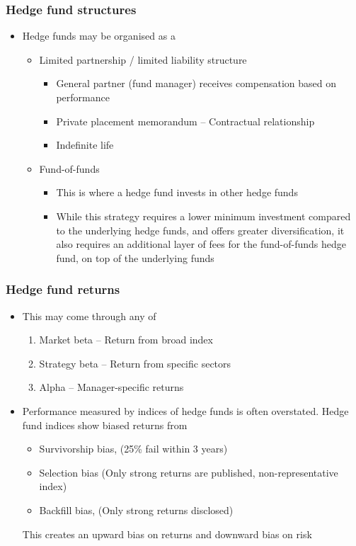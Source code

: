 \documentclass[../notes_compiled.tex]{subfiles}
\begin{document}
\subsubsection{Hedge fund structures}
\begin{itemize}
\item Hedge funds may be organised as a
\begin{itemize}
\item Limited partnership / limited liability structure
\begin{itemize}
\item General partner (fund manager) receives compensation based on performance
\item Private placement memorandum -- Contractual relationship
\item Indefinite life
\end{itemize}
\item Fund-of-funds
\begin{itemize}
\item This is where a hedge fund invests in other hedge funds
\item While this strategy requires a lower minimum investment compared to the underlying hedge funds, and offers greater diversification, it also requires an additional layer of fees for the fund-of-funds hedge fund, on top of the underlying funds
\end{itemize}
\end{itemize}
\end{itemize}

\subsubsection{Hedge fund returns}
\begin{itemize}
\item This may come through any of
\begin{enumerate}
\item Market beta -- Return from broad index
\item Strategy beta -- Return from specific sectors
\item Alpha -- Manager-specific returns
\end{enumerate}
\item Performance measured by indices of hedge funds is often overstated. Hedge fund indices show biased returns from
\begin{itemize}
\item Survivorship bias, (25\% fail within 3 years)
\item Selection bias (Only strong returns are published, non-representative index)
\item Backfill bias, (Only strong returns disclosed)
\end{itemize}
This creates an upward bias on returns and downward bias on risk
\end{itemize}
\end{document}
